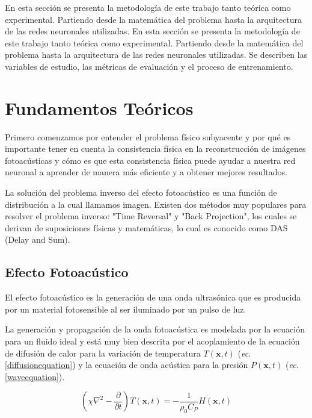 En esta sección se presenta la metodología de este trabajo tanto teórica como experimental. Partiendo desde la matemática del problema hasta la arquitectura de las redes neuronales utilizadas. En esta sección se presenta la metodología de este trabajo tanto teórica como experimental. Partiendo desde la matemática del problema hasta la arquitectura de las redes neuronales utilizadas. Se describen las variables de estudio, las métricas de evaluación y el proceso de entrenamiento.

\section{Fundamentos Teóricos} \label{sec:fundamentos}

Primero comenzamos por entender el problema físico subyacente y por qué es importante tener en cuenta la consistencia física en la reconstrucción de imágenes fotoacústicas y cómo es que esta consistencia física puede ayudar a nuestra red neuronal a aprender de manera más eficiente y a obtener mejores resultados.

La solución del problema inverso del efecto fotoacústico es una función de distribución a la cual llamamos imagen. Existen dos métodos muy populares para resolver el problema inverso: "Time Reversal" y "Back Projection", los cuales se derivan de suposiciones físicas y matemáticas, lo cual es conocido como DAS (Delay and Sum).

\subsection{Efecto Fotoacústico}

El efecto fotoacústico es la generación de una onda ultrasónica que es producida por un material fotosensible al ser iluminado por un pulso de luz. 

La generación y propagación de la onda fotoacústica es modelada por la ecuación para un fluido ideal y está muy bien descrita por el acoplamiento de la ecuación de difusión de calor para la variación de temperatura $T(\mathbf{x}, t)$ (\textit{ec}. \ref{diffusionequation}) y la ecuación de onda acústica para la presión $P(\mathbf{x}, t)$ (\textit{ec.} \ref{waveequation}).

\begin{equation}
    (\chi \nabla^2  - \frac{\partial}{\partial t})T(\mathbf{x}, t) = - \frac{1}{\rho_{0}C_{P}}H(\mathbf{x}, t)
    \label{diffusionequation}
\end{equation}

